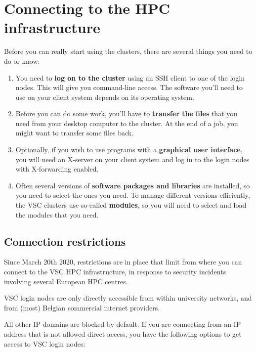 \chapter{Connecting to the HPC infrastructure}
\label{ch:connecting}

Before you can really start using the \hpc clusters, there are several things you need to do or know:

\begin{enumerate}
\item  You need to \textbf{log on to the cluster} using an SSH client to one of the login nodes. This will give you command-line access. The software you'll need to use on your client system depends on its operating system.
\item  Before you can do some work, you'll have to \textbf{transfer the files} that you need from your desktop computer to the cluster. At the end of a job, you might want to transfer some files back.
\item  Optionally, if you wish to use programs with a \textbf{graphical user interface}, you will need an X-server on your client system and log in to the login nodes with X-forwarding enabled.
\item  Often several versions of \textbf{software packages and libraries} are installed, so you need to select the ones you need. To manage different versions efficiently, the VSC clusters use so-called \textbf{modules}, so you will need to select and load the modules that you need.
\end{enumerate}

\section{Connection restrictions}
\label{sec:connection-restrictions}

Since March 20th 2020, restrictions are in place that limit from where you can connect
to the VSC HPC infrastructure, in response to security incidents involving several European HPC centres.

VSC login nodes are only directly accessible from within university networks,
and from (most) Belgian commercial internet providers.

All other IP domains are blocked by default.
If you are connecting from an IP address that is not allowed direct access,
you have the following options to get access to VSC login nodes:


